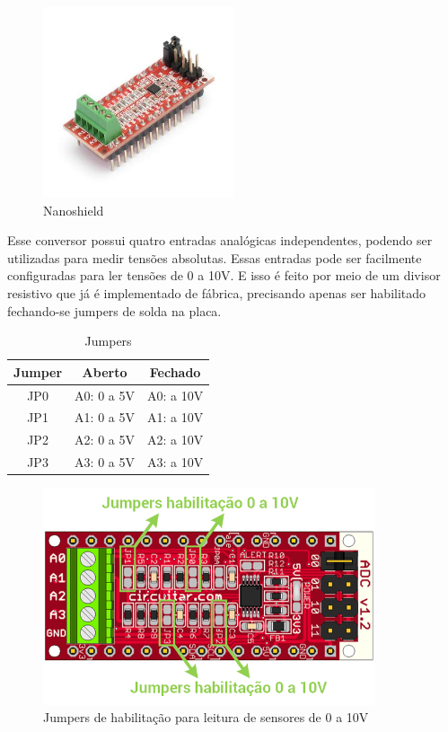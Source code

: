 			\begin{figure}[h]
        \centering
        \includegraphics[width=0.5\textwidth]{figuras/nanoshield}
        \caption{Nanoshield}
        \label{img:nanoshield}
      \end{figure}

			Esse conversor possui quatro entradas analógicas independentes, podendo ser utilizadas para medir tensões absolutas. Essas entradas pode ser facilmente configuradas para ler tensões de 0 a 10V. E isso é feito por meio de um divisor resistivo que já é implementado de fábrica, precisando apenas ser habilitado fechando-se jumpers de solda na placa.

			\begin{table}[h!]
				\centering
				\begin{tabular}{ccc}
					\toprule
						\textbf{Jumper} & \textbf{Aberto} & \textbf{Fechado}\\
					\midrule
						JP0 & A0: 0 a 5V & A0: a 10V\\
						JP1 & A1: 0 a 5V & A1: a 10V\\
						JP2 & A2: 0 a 5V & A2: a 10V\\
						JP3 & A3: 0 a 5V & A3: a 10V\\
					\bottomrule
				\end{tabular}
				\caption{Jumpers}
				\label{tab:jumpers}
			\end{table}

			\begin{figure}[h!]
        \raggedleft
        \includegraphics[width=0.87\textwidth]{figuras/jumpers}
        \caption{Jumpers de habilitação para leitura de sensores de 0 a 10V}
        \label{img:jumpers}
      \end{figure}

